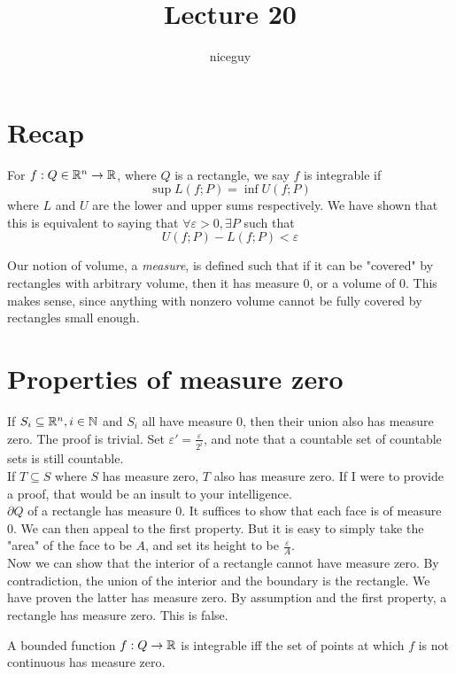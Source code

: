 \documentclass[12pt]{article}
\title{Lecture 20}
\author{niceguy}
\begin{document}
\maketitle

\section{Recap}

For $f:Q \in \mathbb{R}^n \rightarrow \mathbb{R}$, where $Q$ is a rectangle, we say $f$ is integrable if
$$\sup L(f;P) = \inf U(f;P)$$
where $L$ and $U$ are the lower and upper sums respectively. We have shown that this is equivalent to saying that $\forall \varepsilon > 0, \exists P$ such that
$$U(f;P) - L(f;P) < \varepsilon$$

Our notion of volume, a \textit{measure}, is defined such that if it can be "covered" by rectangles with arbitrary volume, then it has measure 0, or a volume of 0. This makes sense, since anything with nonzero volume cannot be fully covered by rectangles small enough.

\section{Properties of measure zero}

If $S_i \subseteq \mathbb{R}^n, i \in \mathbb{N}$ and $S_i$ all have measure 0, then their union also has measure zero. The proof is trivial. Set $\varepsilon' = \frac{\varepsilon}{2^i}$, and note that a countable set of countable sets is still countable. \\

If $T \subseteq S$ where $S$ has measure zero, $T$ also has measure zero. If I were to provide a proof, that would be an insult to your intelligence. \\

$\partial Q$ of a rectangle has measure 0. It suffices to show that each face is of measure 0. We can then appeal to the first property. But it is easy to simply take the "area" of the face to be $A$, and set its height to be $\frac{\varepsilon}{A}$. \\

Now we can show that the interior of a rectangle cannot have measure zero. By contradiction, the union of the interior and the boundary is the rectangle. We have proven the latter has measure zero. By assumption and the first property, a rectangle has measure zero. This is false.

\begin{thm}
    A bounded function $f: Q \rightarrow \mathbb{R}$ is integrable iff the set of points at which $f$ is not continuous has measure zero.
\end{thm}
\end{document}
